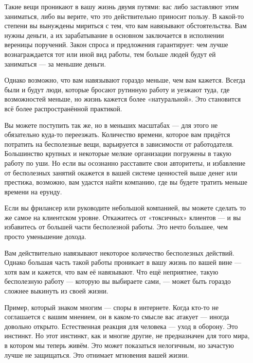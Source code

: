 \documentclass[ebook,12pt,oneside,openany]{memoir}
\begin{document}
Такие вещи проникают в вашу жизнь двумя путями: вас либо заставляют
этим заниматься, либо вы верите, что это действительно приносит
пользу. В какой-то степени вы вынуждены мириться с тем, что вам
навязывают обстоятельства. Вам нужны деньги, а их зарабатывание в
основном заключается в исполнении вереницы поручений. Закон спроса и
предложения гарантирует: чем лучше вознаграждается тот или иной вид
работы, тем больше людей будут ей заниматься — за меньшие деньги. \newline

Однако возможно, что вам навязывают гораздо меньше, чем вам кажется.
Всегда были и будут люди, которые бросают рутинную работу и уезжают
туда, где возможностей меньше, но жизнь кажется более «натуральной».
Это становится всё более распространённой практикой. \newline

Вы можете поступить так же, но в меньших масштабах — для этого не
обязательно куда-то переезжать. Количество времени, которое вам
придётся потратить на бесполезные вещи, варьируется в зависимости от
работодателя. Большинство крупных и некоторые мелкие организации
погружены в такую работу по уши. Но если вы осознанно расставите свои
авторитеты, и избавление от бесполезных занятий окажется в вашей
системе ценностей выше денег или престижа, возможно, вам удастся найти
компанию, где вы будете тратить меньше времени на ерунду. \newline

Если вы фрилансер или руководите небольшой компанией, вы можете
сделать то же самое на клиентском уровне. Откажитесь от «токсичных»
клиентов — и вы избавитесь от большей части бесполезной работы. Это
нечто большее, чем просто уменьшение дохода. \newline

Вам действительно навязывают некоторое количество бесполезных
действий. Однако большая часть такой работы проникает в вашу жизнь по
вашей вине — хотя вам и кажется, что вам её навязывают. Что ещё
неприятнее, такую бесполезную работу — которую вы выбираете сами, —
может быть гораздо сложнее выкинуть из своей жизни. \newline

Пример, который знаком многим — споры в интернете. Когда кто-то не
соглашается с вашим мнением, он в каком-то смысле вас атакует — иногда
довольно открыто. Естественная реакция для человека — уход в оборону.
Это инстинкт. Но этот инстинкт, как и многие другие, не предназначен
для того мира, в котором мы теперь живём. Это может показаться
нелогичным, но зачастую лучше не защищаться. Это отнимает мгновения
вашей жизни. \newline
\end{document}
